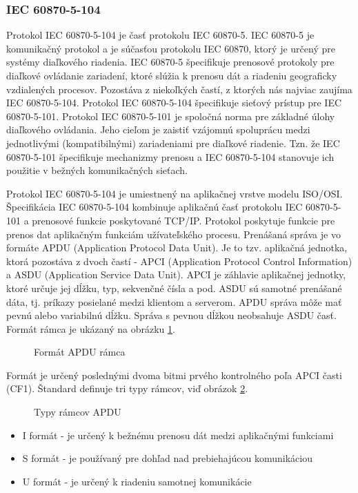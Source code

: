 \subsubsection{IEC 60870-5-104}
\tab Protokol IEC 60870-5-104 je časť protokolu IEC 60870-5. IEC 60870-5 je komunikačný protokol a je súčasťou protokolu IEC 60870, ktorý je určený pre systémy diaľkového riadenia. IEC 60870-5 špecifikuje prenosové protokoly pre diaľkové ovládanie zariadení, ktoré slúžia k prenosu dát a riadeniu geograficky vzdialených procesov. Pozostáva z niekoľkých častí, z ktorých nás najviac zaujíma IEC 60870-5-104. Protokol IEC 60870-5-104 špecifikuje sieťový prístup pre IEC 60870-5-101. Protokol IEC 60870-5-101 je spoločná norma pre základné úlohy diaľkového ovládania. Jeho cieľom je zaistiť vzájomnú spoluprácu medzi jednotlivými (kompatibilnými) zariadeniami pre diaľkové riadenie. Tzn. že IEC 60870-5-101 špecifikuje mechanizmy prenosu a IEC 60870-5-104 stanovuje ich použitie v bežných komunikačných sieťach\cite{SCADA}\cite{Pekarek}.\par
Protokol IEC 60870-5-104 je umiestnený na aplikačnej vrstve modelu ISO/OSI. Špecifikácia IEC 60870-5-104 kombinuje aplikačnú časť protokolu IEC 60870-5-101 a prenosové funkcie poskytované TCP/IP. Protokol poskytuje funkcie pre prenos dat aplikačným funkciám užívateľského procesu. Prenášaná správa je vo formáte APDU (Application Protocol Data Unit). Je to tzv. aplikačná jednotka, ktorá pozostáva z dvoch častí - APCI (Application Protocol Control Information) a ASDU (Application Service Data Unit). APCI je záhlavie aplikačnej jednotky, ktoré určuje jej dĺžku, typ, sekvenčné čísla a pod. ASDU sú samotné prenášané dáta, tj. príkazy posielané medzi klientom a serverom. APDU správa môže mať pevnú alebo variabilnú dĺžku. Správa s pevnou dĺžkou neobsahuje ASDU časť. Formát rámca je ukázaný na obrázku \ref{APDU}.
\begin{figure}[h]
    \centering
    \caption{Formát APDU rámca\cite{iec}}
\label{APDU}
\end{figure}
Formát je určený poslednými dvoma bitmi prvého kontrolného poľa APCI časti (CF1). Štandard definuje tri typy rámcov, viď obrázok \ref{FrameFormat}.
\begin{figure}[h]
    \centering
    \caption{Typy rámcov APDU\cite{iec}}
\label{FrameFormat}
\end{figure}
\begin{itemize}
\item I formát - je určený k bežnému prenosu dát medzi aplikačnými funkciami
\item S formát - je používaný pre dohľad nad prebiehajúcou komunikáciou
\item U formát - je určený k riadeniu samotnej komunikácie
\end{itemize}
